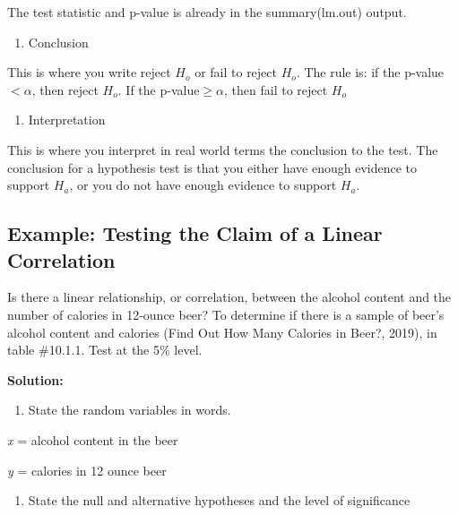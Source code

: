 \documentclass[]{book}
\providecommand{\tightlist}{%
  \setlength{\itemsep}{0pt}\setlength{\parskip}{0pt}}
\begin{document}
The test statistic and p-value is already in the summary(lm.out) output.

\begin{enumerate}
\def\labelenumi{\arabic{enumi}.}
\setcounter{enumi}{4}
\tightlist
\item
  Conclusion
\end{enumerate}

This is where you write reject \(H_o\) or fail to reject \(H_o\). The rule is: if the p-value \(<\alpha\), then reject \(H_o\). If the p-value\(\ge \alpha\), then fail to reject \(H_o\)

\begin{enumerate}
\def\labelenumi{\arabic{enumi}.}
\setcounter{enumi}{5}
\tightlist
\item
  Interpretation
\end{enumerate}

This is where you interpret in real world terms the conclusion to the test. The conclusion for a hypothesis test is that you either have enough evidence to support \(H_a\), or you do not have enough evidence to support \(H_a\).

\hypertarget{example-testing-the-claim-of-a-linear-correlation}{%
\subsection{Example: Testing the Claim of a Linear Correlation}\label{example-testing-the-claim-of-a-linear-correlation}}

Is there a linear relationship, or correlation, between the alcohol content and the number of calories in 12-ounce beer? To determine if there is a sample of beer's alcohol content and calories (Find Out How Many Calories in Beer?, 2019), in table \#10.1.1. Test at the 5\% level.

\textbf{Solution:}

\begin{enumerate}
\def\labelenumi{\arabic{enumi}.}
\tightlist
\item
  State the random variables in words.
\end{enumerate}

\emph{x} = alcohol content in the beer

\emph{y} = calories in 12 ounce beer

\begin{enumerate}
\def\labelenumi{\arabic{enumi}.}
\setcounter{enumi}{1}
\tightlist
\item
  State the null and alternative hypotheses and the level of significance
\end{enumerate}
\end{document}

